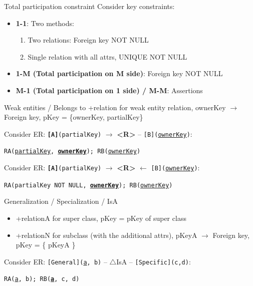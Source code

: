 \begin{theorem}
    {Total participation constraint}
    Consider key constraints:
    \begin{itemize}
        \item \textbf{1-1}: Two methods:
              \begin{enumerate}
                  \item Two relations: Foreign key NOT NULL
                  \item Single relation with all attrs, UNIQUE NOT NULL
              \end{enumerate}
        \item \textbf{1-M (Total participation on M side)}: Foreign key NOT NULL
        \item \textbf{M-1 (Total participation on 1 side) / M-M}: Assertions
    \end{itemize}
\end{theorem}

\begin{theorem}
    {Weak entities / Belongs to}
    +relation for weak entity relation, ownerKey $\to$ Foreign key, pKey = \{ownerKey, partialKey\}

    \tcblower

    Consider ER: \texttt{\textbf{[A]}(partialKey)} $\rightarrow$ \textbf{<R>} -- \texttt{[B](\underline{ownerKey})}:

    \texttt{RA(\underline{partialKey}, \underline{\textbf{ownerKey}}); RB(\underline{ownerKey})}

    Consider ER: \texttt{\textbf{[A]}(partialKey)} $\rightarrow$ \textbf{<R>} $\leftarrow$ \texttt{[B](\underline{ownerKey})}:

    \texttt{RA(partialKey NOT NULL, \underline{\textbf{ownerKey}}); RB(\underline{ownerKey})}
\end{theorem}

\begin{theorem}
    {Generalization / Specialization / IsA}

    \begin{itemize}
        \item +relationA for super class, pKey = pKey of super class
        \item +relationN for subclass (with the additional attrs), pKeyA $\to$ Foreign key, pKey = \{ pKeyA \}
    \end{itemize}

    \tcblower

    Consider ER: \texttt{[General](\underline{a}, b)} -- $\triangle$IsA -- \texttt{[Specific](c,d)}:

    \texttt{RA(\underline{a}, b); RB(\underline{\textbf{a}}, c, d)}
\end{theorem}

